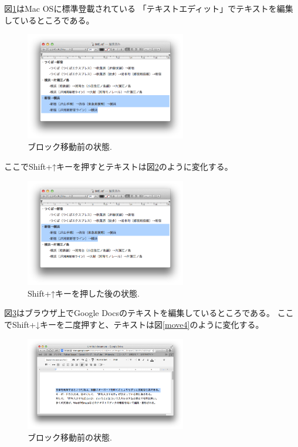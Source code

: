 図\ref{move1}はMac OSに標準登載されている
「テキストエディット」でテキストを編集しているところである。

\begin{figure}[H]
\centerline{\includegraphics[width=70mm,bb=0 0 703 472]{figures/block2.png}}
\caption{ブロック移動前の状態.}
\label{move1}
\end{figure}

ここでShift+↑キーを押すとテキストは図\ref{move2}のように変化する。

\begin{figure}[H]
\centerline{\includegraphics[width=70mm,bb=0 0 703 472]{figures/block3.png}}
\caption{Shift+↑キーを押した後の状態.}
\label{move2}
\end{figure}

図\ref{move3}はブラウザ上でGoogle Docsのテキストを編集しているところである。
ここでShift+↓キーを二度押すと、テキストは図\ref{move4}のように変化する。

\begin{figure}[H]
\centerline{\includegraphics[width=70mm,bb=0 0 935 542]{figures/block4.png}}
\caption{ブロック移動前の状態.}
\label{move3}
\end{figure}

